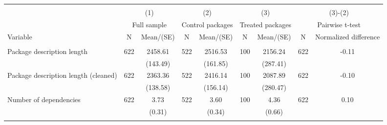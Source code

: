 
\begin{tabular}{@{\extracolsep{5pt}}lcccccccc}
\\[-1.8ex]\hline \hline \\[-1.8ex]
 & \multicolumn{2}{c}{(1)}  & \multicolumn{2}{c}{(2)}  & \multicolumn{2}{c}{(3)}  & \multicolumn{2}{c}{(3)-(2)} \\
 & \multicolumn{2}{c}{Full sample}  & \multicolumn{2}{c}{Control packages}  & \multicolumn{2}{c}{Treated packages}  & \multicolumn{2}{c}{Pairwise t-test}  \\
Variable & N & Mean/(SE) & N & Mean/(SE) & N & Mean/(SE) & N & Normalized difference \\ \hline \\[-1.8ex] 
Package description length   & 622    & 2458.61    & 522    & 2516.53    & 100    & 2156.24    & 622    & -0.11   \\
 &   & (143.49)  &   & (161.85)  &   & (287.41)  &   &  \\ [1ex]
Package description length (cleaned)   & 622    & 2363.36    & 522    & 2416.14    & 100    & 2087.89    & 622    & -0.10   \\
 &   & (138.58)  &   & (156.14)  &   & (280.47)  &   &  \\ [1ex]
Number of dependencies   & 622    & 3.73    & 522    & 3.60    & 100    & 4.36    & 622    & 0.10   \\
 &   & (0.31)  &   & (0.34)  &   & (0.66)  &   &  \\ [1ex]
\hline \hline \\[-1.8ex]

\end{tabular}
